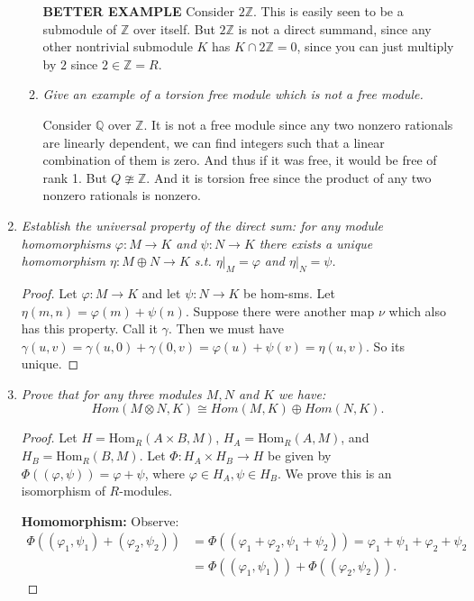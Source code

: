 \documentclass[9pt,reqno,twoside]{amsbook}
\theoremstyle{plain}
\numberwithin{section}{chapter}
\numberwithin{equation}{chapter}
\theoremstyle{definition}
\theoremstyle{remark}
\theoremstyle{plain}
\newcommand{\z}{\mathbb{Z}}
\newcommand{\Q}{\mathbb{Q}}
\newcommand{\bb}{\vspace{3mm}}
\renewcommand{\phi}{\varphi}
\begin{document}
\begin{enumerate}[label=\arabic*.]
\begin{enumerate}
\textbf{BETTER EXAMPLE} Consider $2\z$. This is easily seen to be a submodule of $\z$ over itself. But $2\z$ is not a direct summand, since any other nontrivial submodule $K$ has $K \cap 2\z = 0$, since you can just multiply by $2$ since $2 \in \z = R$. 
\bb
\item \textit{Give an example of a torsion free module which is not a free module. }

Consider $\Q$ over $\z$. It is not a free module since any two nonzero rationals are linearly dependent, we can find integers such that a linear combination of them is zero. And thus if it was free, it would be free of rank 1. But $Q \ncong \z$. And it is torsion free since the product of any two nonzero rationals is nonzero. 
\end{enumerate}
\bb

\item \textit{Establish the universal property of the direct sum: for any module homomorphisms $\phi:M \to K$ and $\psi:N \to K$ there exists a unique homomorphism $\eta:M \oplus N \to K$ s.t. $\eta|_M = \phi$ and $\eta|_N = \psi$. }

\begin{proof}
Let $\phi:M \to K$ and let $\psi:N \to K$ be hom-sms. Let $\eta(m,n) = \phi(m) + \psi(n)$. Suppose there were another map $\nu$ which also has this property. Call it $
\gamma$. Then we must have $\gamma(u,v) = \gamma(u,0) + \gamma(0,v) = \phi(u) + \psi(v) = \eta(u,v)$. So its unique. 
\end{proof}

\item \textit{Prove that for any three modules $M,N$ and $K$ we have:
$$
Hom(M \otimes N,K) \cong Hom(M,K) \oplus Hom(N,K).
$$}

\begin{proof}
Let $H = \text{Hom}_R(A\times B,M)$, $H_A = \text{Hom}_R(A,M)$, and $H_B = \text{Hom}_R(B,M)$. Let $\Phi: H_A \times H_B\to H$ be given by $\Phi((\phi,\psi)) = \phi + \psi$, where $\phi \in H_A,\psi \in H_B$. We prove this is an isomorphism of $R$-modules. 

\textbf{Homomorphism: }Observe: 
\begin{equation}
\begin{aligned}
\Phi((\phi_1,\psi_1) + (\phi_2,\psi_2)) &= \Phi((\phi_1 + \phi_2,\psi_1 + \psi_2)) = \phi_1 + \psi_1 + \phi_2 + \psi_2\\ &= \Phi((\phi_1,\psi_1)) + \Phi((\phi_2,\psi_2)).
\end{aligned}
\end{equation}


\end{proof}
\end{enumerate}
\end{document}
